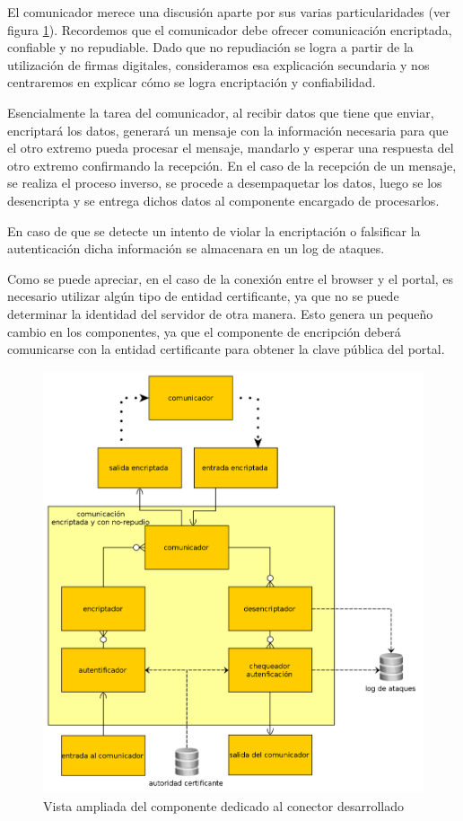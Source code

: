 El comunicador merece una discusión aparte por sus varias particularidades (ver figura \ref{fig:comunicador}). Recordemos que el comunicador debe ofrecer comunicación encriptada, confiable y no repudiable. Dado que no repudiación se logra a partir de la utilización de firmas digitales, consideramos esa explicación secundaria y nos centraremos en explicar cómo se logra encriptación y confiabilidad.

Esencialmente la tarea del comunicador, al recibir datos que tiene que enviar, encriptará los datos, generará un mensaje con la información necesaria para que el otro extremo pueda procesar el mensaje, mandarlo y esperar una respuesta del otro extremo confirmando la recepción.
En el caso de la recepción de un mensaje, se realiza el proceso inverso, se procede a desempaquetar los datos, luego se los desencripta y se entrega dichos datos al componente encargado de procesarlos.

En caso de que se detecte un intento de violar la encriptación o falsificar la autenticación dicha información se almacenara en un log de ataques.

Como se puede apreciar, en el caso de la conexión entre el browser y el portal, es necesario utilizar algún tipo de entidad certificante, ya que no se puede determinar la identidad del servidor de otra manera. Esto genera un pequeño cambio en los componentes, ya que el componente de encripción deberá comunicarse con la entidad certificante para obtener la clave pública del portal.

\begin{figure}[H]
	\begin{center}
		\includegraphics[scale=0.26]{../diagramas/conector.png}
	\end{center} 
	\caption{Vista ampliada del componente dedicado al conector desarrollado}	
	\label{fig:comunicador}
\end{figure} 

